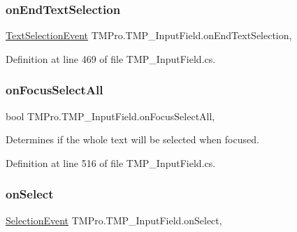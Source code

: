 \subsubsection{\texorpdfstring{onEndTextSelection}{onEndTextSelection}}
{\footnotesize\ttfamily \mbox{\hyperlink{class_t_m_pro_1_1_t_m_p___input_field_1_1_text_selection_event}{Text\+Selection\+Event}} T\+M\+Pro.\+T\+M\+P\+\_\+\+Input\+Field.\+on\+End\+Text\+Selection\hspace{0.3cm}{\ttfamily [get]}, {\ttfamily [set]}}



Definition at line 469 of file T\+M\+P\+\_\+\+Input\+Field.\+cs.

\mbox{\label{class_t_m_pro_1_1_t_m_p___input_field_abf3bccd8c0c63eff2f8de40194d6aeb7}} 
\subsubsection{\texorpdfstring{onFocusSelectAll}{onFocusSelectAll}}
{\footnotesize\ttfamily bool T\+M\+Pro.\+T\+M\+P\+\_\+\+Input\+Field.\+on\+Focus\+Select\+All\hspace{0.3cm}{\ttfamily [get]}, {\ttfamily [set]}}



Determines if the whole text will be selected when focused. 



Definition at line 516 of file T\+M\+P\+\_\+\+Input\+Field.\+cs.

\mbox{\label{class_t_m_pro_1_1_t_m_p___input_field_aff088e8d938f85dd7a143f7d4e9576af}} 
\subsubsection{\texorpdfstring{onSelect}{onSelect}}
{\footnotesize\ttfamily \mbox{\hyperlink{class_t_m_pro_1_1_t_m_p___input_field_1_1_selection_event}{Selection\+Event}} T\+M\+Pro.\+T\+M\+P\+\_\+\+Input\+Field.\+on\+Select\hspace{0.3cm}{\ttfamily [get]}, {\ttfamily [set]}}



